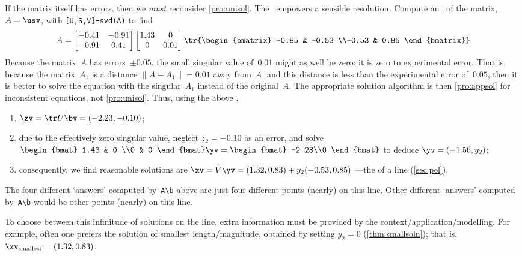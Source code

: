 \begin{example}
\begin{solution}
 If the matrix itself has errors, then we \emph{must} reconsider \cref{pro:unisol}.
The \svd\ empowers a sensible resolution.
Compute an \svd\ of the matrix, \(A=\usv\), with \verb|[U,S,V]=svd(A)| to find \twodp
\setbox\ajrqrbox\hbox{}%
\marginajrbox%
\begin{equation*}
A=\begin{bmatrix} -0.41 & -0.91
\\-0.91 &  0.41 \end{bmatrix}
\begin{bmatrix} 1.43 & 0
\\0 &  0.01 \end{bmatrix}
\tr{\begin{bmatrix} -0.85 & -0.53
\\-0.53 &  0.85 \end{bmatrix}}
\end{equation*}
Because the matrix~\(A\) has errors~\(\pm0.05\), the small singular value of~\(0.01\) might as well be zero: it is zero to experimental error.
That is, because the matrix~\(A_1\) is a distance \(\|A-A_1\|=0.01\) away from~\(A\), and this distance is less than the experimental error of~\(0.05\), then it is better to solve the equation with the singular~\(A_1\) instead of the original~\(A\).
The appropriate solution algorithm is then \cref{pro:appsol} for inconsistent equations, not \cref{pro:unisol}.
Thus, using the above \svd, \twodp
\begin{enumerate}
\item \(\zv=\tr U\bv=(-2.23,-0.10)\);
\item due to the effectively zero singular value, neglect \(z_2=-0.10\) as an error, and solve
\(\begin{bmat} 1.43 & 0
\\0 &  0 \end{bmat}\yv=\begin{bmat} -2.23\\0 \end{bmat}\)
to deduce \(\yv=(-1.56,y_2)\);
\item consequently, we find reasonable solutions are \(\xv=V\yv=(1.32,0.83)+y_2(-0.53,0.85)\) ---the  of a line (\cref{sec:pel}).
\end{enumerate}
The four different `answers' computed by~\verb|A\b| above are just four different points (nearly) on this line.
Other different `answers' computed by~\verb|A\b| would be other points (nearly) on this line.

 To choose between this infinitude of solutions on the line, extra information must be provided by the context\slash application\slash modelling.  
For example, often one prefers the solution of smallest length\slash magnitude, obtained by setting \(y_2=0\) (\cref{thm:smallsoln}); that is, \(\xv_{\text{smallest}}=(1.32,0.83)\).
\end{solution}
\end{example}




